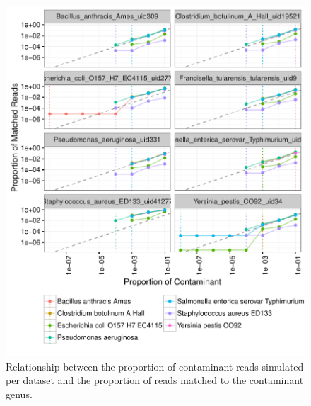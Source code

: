 \documentclass[fleqn,10pt,lineno]{wlpeerj}\usepackage[]{graphicx}\usepackage[]{color}
\makeatletter
\def\maxwidth{ %
  \ifdim\Gin@nat@width>\linewidth
    \linewidth
  \else
    \Gin@nat@width
  \fi
}
\newenvironment{knitrout}{}{} %
\makeatother
\begin{document}
\begin{knitrout}
\color{fgcolor}\begin{figure}

{\centering \includegraphics[width=\maxwidth]{figure/contam_min_plot-1} 

}

\caption[Relationship between the proportion of contaminant reads simulated per dataset and the proportion of reads matched to the contaminant genus]{Relationship between the proportion of contaminant reads simulated per dataset and the proportion of reads matched to the contaminant genus.}\label{fig:contam_min_plot}
\end{figure}


\end{knitrout}
\end{document}
